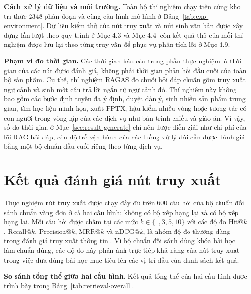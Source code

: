 \documentclass[../DoAn.tex]{subfiles}
\begin{document}
\textbf{Cách xử lý dữ liệu và môi trường.} Toàn bộ thí nghiệm chạy trên cùng kho tri thức 2348 phân đoạn và cùng cấu hình mô hình ở Bảng~\ref{tab:exp-environment}. Dữ liệu kiểm thử của nút truy xuất và nút sinh văn bản được xây dựng lần lượt theo quy trình ở Mục 4.3 và Mục 4.4, còn kết quả thô của mỗi thí nghiệm được lưu lại theo từng truy vấn để phục vụ phân tích lỗi ở Mục 4.9.

\textbf{Phạm vi đo thời gian.} Các thời gian báo cáo trong phần thực nghiệm là thời gian của các nút được đánh giá, không phải thời gian phản hồi đầu cuối của toàn bộ sản phẩm. Cụ thể, thí nghiệm RAGAS đo chuỗi hỏi đáp chuẩn gồm truy xuất ngữ cảnh và sinh một câu trả lời ngắn từ ngữ cảnh đó. Thí nghiệm này không bao gồm các bước định tuyến đa ý định, duyệt dàn ý, sinh nhiều sản phẩm trung gian, tìm học liệu minh họa, xuất PPTX, hậu kiểm nhiều vòng hoặc tương tác có con người trong vòng lặp của các dịch vụ như bản trình chiếu và giáo án. Vì vậy, số đo thời gian ở Mục~\ref{sec:result-generate} chỉ nên được diễn giải như chi phí của lõi RAG hỏi đáp, còn độ trễ vận hành của các luồng xử lý dài cần được đánh giá bằng một bộ chuẩn đầu cuối riêng theo từng dịch vụ.

\section{Kết quả đánh giá nút truy xuất}
\label{sec:result-retrieve}

Thực nghiệm nút truy xuất được chạy đầy đủ trên 600 câu hỏi của bộ chuẩn đối sánh chuẩn vàng đơn ở cả hai cấu hình: không có bộ xếp hạng lại và có bộ xếp hạng lại. Mỗi câu hỏi được chấm tại các mức $k \in \{1,3,5,10\}$ với các độ đo Hit@$k$, Recall@$k$, Precision@$k$, MRR@$k$ và nDCG@$k$, là nhóm độ đo thường dùng trong đánh giá truy xuất thông tin \cite{thakur2021beir,jarvelin2002cumulated}. Vì bộ chuẩn đối sánh dùng khóa bài học làm chuẩn đúng, các độ đo này phản ánh trực tiếp khả năng của nút truy xuất trong việc đưa đúng bài học mục tiêu lên các vị trí đầu của danh sách kết quả.

\textbf{So sánh tổng thể giữa hai cấu hình.} Kết quả tổng thể của hai cấu hình được trình bày trong Bảng~\ref{tab:retrieval-overall}.
\end{document}
